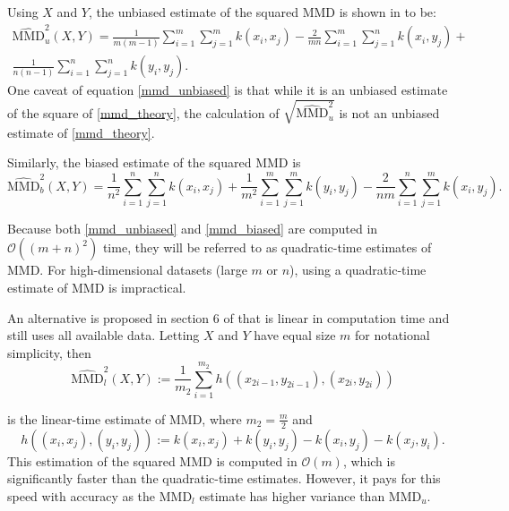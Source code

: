 Using $X$ and $Y$, the unbiased estimate of the squared MMD is shown in \cite{gretton2012kernel} to be:
\begin{equation}
\label{mmd_unbiased}
\begin{split}
\widehat{\text{MMD}}_{u}^{2}(X, Y)=\frac{1}{m(m-1)} \sum_{i=1}^m \sum_{ j=1}^{m} k\left(x_{i}, x_{j}\right)-\frac{2}{m n} \sum_{i=1}^m \sum_{ j=1}^{n} k\left(x_{i}, y_{j}\right)+ \\
\frac{1}{n(n-1)} \sum_{i=1}^n \sum_{j=1}^{n} k\left(y_{i}, y_{j}\right).
\end{split}
\end{equation}
One caveat of equation \ref{mmd_unbiased} is that while it is an unbiased estimate of the square of \ref{mmd_theory}, the calculation of $\sqrt{\widehat{\text{MMD}}_{u}^{2}}$ is not an unbiased estimate of \ref{mmd_theory}.

Similarly, the biased estimate of the squared MMD is
\begin{equation}
\label{mmd_biased}
\widehat{\text{MMD}}_{b}^{2}(X, Y)= \frac{1}{n^{2}} \sum_{i=1}^{n} \sum_{j=1}^{n} k\left(x_{i}, x_{j}\right)+\frac{1}{m^{2}} \sum_{i=1}^{m} \sum_{j=1}^{m} k\left(y_{i}, y_{j}\right)-\frac{2}{n m} \sum_{i=1}^{n} \sum_{j=1}^{m} k\left(x_{i}, y_{j}\right).
\end{equation}

Because both \ref{mmd_unbiased} and \ref{mmd_biased} are computed in $\mathcal{O}((m + n)^2)$ time, they will be referred to as quadratic-time estimates of MMD. For high-dimensional datasets (large $m$ or $n$), using a quadratic-time estimate of MMD is impractical.  

An alternative is proposed in section 6 of \cite{gretton2012kernel} that is linear in computation time and still uses all available data. Letting $X$ and $Y$ have equal size $m$ for notational simplicity, then
\begin{equation}
\label{mmd_linear}
\widehat{\text{MMD}}_{l}^{2}(X, Y) :=\frac{1}{m_{2}} \sum_{i=1}^{m_{2}} h\left(\left(x_{2 i-1}, y_{2 i-1}\right),\left(x_{2 i}, y_{2 i}\right)\right)
\end{equation}

is the linear-time estimate of MMD, where $m_2=\frac{m}{2}$ and
\begin{equation}
h\left((x_i, x_j), (y_i, y_j)\right):=k\left(x_{i}, x_{j}\right)+k\left(y_{i}, y_{j}\right)-k\left(x_{i}, y_{j}\right)-k\left(x_{j}, y_{i}\right).
\end{equation}
This estimation of the squared MMD is computed in $\mathcal{O}(m)$, which is significantly faster than the quadratic-time estimates. However, it pays for this speed with accuracy as the MMD$_l$ estimate has higher variance than MMD$_u$.

